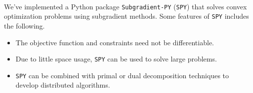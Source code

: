 \\
We've implemented a Python package \verb'Subgradient-PY' (\verb'SPY') that solves convex optimization problems using subgradient methods. Some features of \verb'SPY' includes the following.
\begin{itemize}
\item The objective function and constraints need not be differentiable.
\item Due to little space usage, \verb'SPY' can be used to solve large problems.
\item \verb'SPY' can be combined with primal or dual decomposition techniques to develop distributed algorithms.
\end{itemize}
